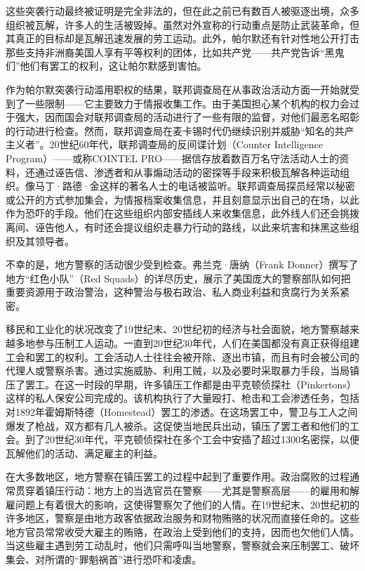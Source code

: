 \documentclass[fontset=fandol, a4paper, 12pt, openright]{ctexbook}
\begin{document}
这些突袭行动最终被证明是完全非法的，但在此之前已有数百人被驱逐出境，众多组织被瓦解，许多人的生活被毁掉。虽然对外宣称的行动重点是防止武装革命，但其真正的目标却是瓦解迅速发展的劳工运动。此外，帕尔默还有针对性地公开打击那些支持非洲裔美国人享有平等权利的团体，比如共产党——共产党告诉“黑鬼们”他们有罢工的权利，这让帕尔默感到害怕。

作为帕尔默突袭行动滥用职权的结果，联邦调查局在从事政治活动方面一开始就受到了一些限制——它主要致力于情报收集工作。由于美国担心某个机构的权力会过于强大，因而国会对联邦调查局的活动进行了一些有限的监督，对他们最恶名昭彰的行动进行检查。然而，联邦调查局在麦卡锡时代仍继续识别并威胁“知名的共产主义者”。20世纪60年代，联邦调查局的反间谍计划（Counter Intelligence Program）——或称COINTEL PRO——据信存放着数百万名守法活动人士的资料，还通过诬告信、渗透者和从事煽动活动的密探等手段来积极瓦解各种运动组织。像马丁·路德·金这样的著名人士的电话被监听。联邦调查局探员经常以秘密或公开的方式参加集会，为情报档案收集信息，并且刻意显示出自己的在场，以此作为恐吓的手段。他们在这些组织内部安插线人来收集信息，此外线人们还会挑拨离间、诬告他人，有时还会提议组织走暴力行动的路线，以此来坑害和抹黑这些组织及其领导者。

不幸的是，地方警察的活动很少受到检查。弗兰克·唐纳（Frank Donner）撰写了地方“红色小队”（Red Squads）的详尽历史，展示了美国庞大的警察部队如何把重要资源用于政治警治，这种警治与极右政治、私人商业利益和贪腐行为关系紧密。

移民和工业化的状况改变了19世纪末、20世纪初的经济与社会面貌，地方警察越来越多地参与压制工人运动。一直到20世纪30年代，人们在美国都没有真正获得组建工会和罢工的权利。工会活动人士往往会被开除、逐出市镇，而且有时会被公司的代理人或警察杀害。通过实施威胁、利用工贼，以及必要时采取暴力手段，当局镇压了罢工。在这一时段的早期，许多镇压工作都是由平克顿侦探社（Pinkertons）这样的私人保安公司完成的。该机构执行了大量殴打、枪击和工会渗透任务，包括对1892年霍姆斯特德（Homestead）罢工的渗透。在这场罢工中，警卫与工人之间爆发了枪战，双方都有几人被杀。这促使当地民兵出动，镇压了罢工者和他们的工会。到了20世纪30年代，平克顿侦探社在多个工会中安插了超过1300名密探，以便瓦解他们的活动、满足雇主的利益。

在大多数地区，地方警察在镇压罢工的过程中起到了重要作用。政治腐败的过程通常贯穿着镇压行动：地方上的当选官员在警察——尤其是警察高层——的雇用和解雇问题上有着很大的影响，这使得警察欠了他们的人情。在19世纪末、20世纪初的许多地区，警察是由地方政客依据政治服务和财物贿赂的状况而直接任命的。这些地方官员常常收受大雇主的贿赂，在政治上受到他们的支持，因而也欠他们人情。当这些雇主遇到劳工动乱时，他们只需呼叫当地警察，警察就会来压制罢工、破坏集会、对所谓的“罪魁祸首”进行恐吓和凌虐。
\end{document}
